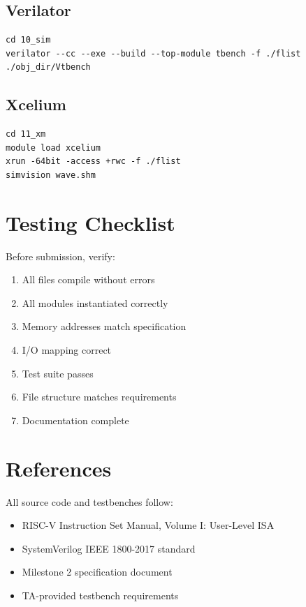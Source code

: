 \subsection{Verilator}

\begin{verbatim}
cd 10_sim
verilator --cc --exe --build --top-module tbench -f ./flist
./obj_dir/Vtbench
\end{verbatim}

\subsection{Xcelium}

\begin{verbatim}
cd 11_xm
module load xcelium
xrun -64bit -access +rwc -f ./flist
simvision wave.shm
\end{verbatim}

\section{Testing Checklist}

Before submission, verify:

\begin{enumerate}
    \item All files compile without errors
    \item All modules instantiated correctly
    \item Memory addresses match specification
    \item I/O mapping correct
    \item Test suite passes
    \item File structure matches requirements
    \item Documentation complete
\end{enumerate}

\section{References}

All source code and testbenches follow:

\begin{itemize}
    \item RISC-V Instruction Set Manual, Volume I: User-Level ISA
    \item SystemVerilog IEEE 1800-2017 standard
    \item Milestone 2 specification document
    \item TA-provided testbench requirements
\end{itemize}

